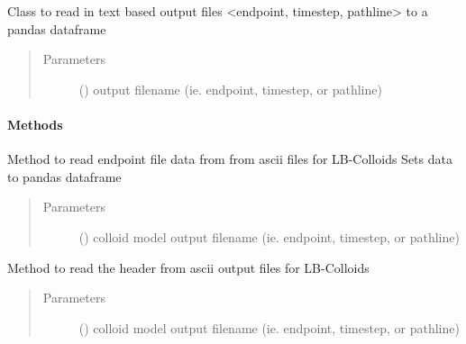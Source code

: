 \documentclass[letterpaper,10pt,english]{sphinxmanual}
\begin{document}

\begin{fulllineitems}
\label{\detokenize{index:lb_colloids.Colloids.Colloid_output.ASCIIReader}}
Class to read in text based output files \textless{}endpoint, timestep, pathline\textgreater{}
to a pandas dataframe
\begin{quote}\begin{description}
\item[{Parameters}] \leavevmode
{} () \textendash{} output filename (ie. endpoint, timestep, or pathline)

\end{description}\end{quote}
\paragraph{Methods}

\begin{fulllineitems}
\label{\detokenize{index:lb_colloids.Colloids.Colloid_output.ASCIIReader.read_ascii}}
Method to read endpoint file data from from ascii files for LB-Colloids
Sets data to pandas dataframe
\begin{quote}\begin{description}
\item[{Parameters}] \leavevmode
{} () \textendash{} colloid model output filename (ie. endpoint, timestep, or pathline)

\end{description}\end{quote}

\end{fulllineitems}


\begin{fulllineitems}
\label{\detokenize{index:lb_colloids.Colloids.Colloid_output.ASCIIReader.read_header}}
Method to read the header from ascii output files for LB-Colloids
\begin{quote}\begin{description}
\item[{Parameters}] \leavevmode
{} () \textendash{} colloid model output filename (ie. endpoint, timestep, or pathline)


\end{description}
\end{quote}
\end{fulllineitems}
\end{fulllineitems}
\end{document}
